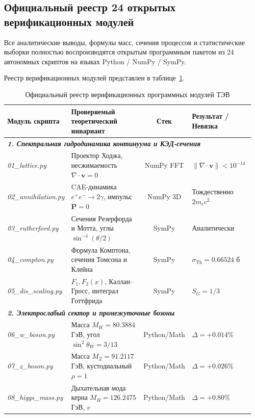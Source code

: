 \documentclass[11pt,a4paper]{article}
\theoremstyle{definition}
\theoremstyle{remark}
\begin{document}
\subsection{Официальный реестр 24 открытых верификационных модулей}
Все аналитические выводы, формулы масс, сечения процессов и статистические выборки полностью воспроизводятся открытым программным пакетом из 24 автономных скриптов на языках Python / NumPy / SymPy. 

Реестр верификационных модулей представлен в таблице~\ref{tab:script_registry_full}.

\begin{table}[H]
\centering
\small
\caption{Официальный реестр верификационных программных модулей ТЭВ}
\label{tab:script_registry_full}
\vspace{2mm}
\begin{tabularx}{\textwidth}{l p{5.5cm} c >{\raggedleft\arraybackslash}X}
\toprule
\textbf{Модуль скрипта} & \textbf{Проверяемый теоретический инвариант} & \textbf{Стек} & \textbf{Результат / Невязка} \\
\midrule
\multicolumn{4}{l}{\textit{\textbf{1. Спектральная гидродинамика континуума и КЭД-сечения}}} \\
\textit{01\_lattice.py} & Проектор Ходжа, несжимаемость $\nabla\cdot\mathbf{v} = 0$ & NumPy FFT & $\|\nabla\cdot\mathbf{v}\| < 10^{-14}$ \\
\textit{02\_annihilation.py} & CAE-динамика $e^+e^- \to 2\gamma$, импульс $\mathbf{P}=0$ & NumPy 3D & Тождественно $2 m_e c^2$ \\
\textit{03\_rutherford.py} & Сечения Резерфорда и Мотта, углы $\sin^{-4}(\theta/2)$ & SymPy & Аналитически \\
\textit{04\_compton.py} & Формула Комптона, сечения Томсона и Клейна & SymPy & $\sigma_{\mathrm{Th}} = 0.66524\text{ б}$ \\
\textit{05\_dis\_scaling.py} & $F_1, F_2(x)$, Каллан--Гросс, интеграл Готтфрида & SymPy & $S_G = 1/3$ \\
\midrule
\multicolumn{4}{l}{\textit{\textbf{2. Электрослабый сектор и промежуточные бозоны}}} \\
\textit{06\_w\_boson.py} & Масса $M_W = 80.3884$ ГэВ, угол $\sin^2\theta_W = 3/13$ & Python/Math & $\Delta = +0.014\%$ \\
\textit{07\_z\_boson.py} & Масса $M_Z = 91.2117$ ГэВ, кустодиальный $\rho = 1$ & Python/Math & $\Delta = +0.026\%$ \\
\textit{08\_higgs\_mass.py} & Дыхательная мода керна $M_H = 126.2475$ ГэВ, $v$ & Python/Math & $\Delta = +0.80\%$ \\

\end{tabularx}
\end{table}
\end{document}
